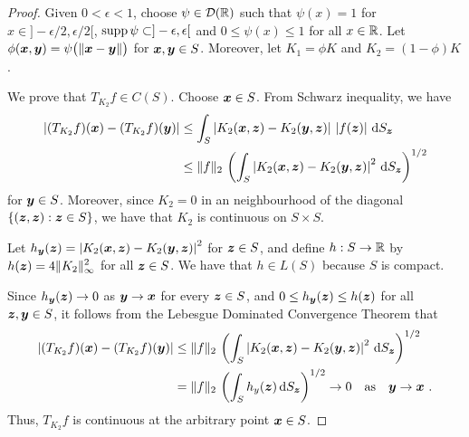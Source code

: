 \begin{proof}
Given $0 < \epsilon < 1$, choose $\psi \in \mathcal{D}(\mathbb{R})$ such that
$\psi(x)=1$ for $x \in ]-\epsilon/2, \epsilon/2[$,
$\operatorname{supp} \psi \subset ]-\epsilon, \epsilon[$ and $0\leq \psi(x)\leq 1$
for all $x\in \mathbb{R}$.  Let
$\phi({\bm{x}},{\bm{y}}) = \psi\big(\|{\bm{x}}-{\bm{y}}\|\big)$ for
${\bm{x}}, {\bm{y}} \in S$.  Moreover, let $K_1 = \phi K$ and
$K_2 = (1-\phi)K$.

 We prove that $T_{K_2} f \in C(S)$.  Choose ${\bm{x}}\in S$.
From Schwarz inequality, we have
\begin{align*}
\left| (T_{K_2} f)({\bm{x}}) - (T_{K_2} f)({\bm{y}})\right|
&\leq \int_S \left| K_2({\bm{x}},{\bm{z}}) - K_2({\bm{y}},{\bm{z}}) \right|\,
\left| f({\bm{z}}) \right| \,\mathrm{d}{S}_{{\bm{z}}} \\
&\leq \|f\|_2 \, \left( \int_S \left|K_2({\bm{x}},{\bm{z}}) -
K_2({\bm{y}},{\bm{z}}) \right|^2 \,\mathrm{d}{S}_{{\bm{z}}} \right)^{1/2}
\end{align*}
for ${\bm{y}} \in S$.  Moreover, since $K_2 =0$ in an neighbourhood of
the diagonal $\{({\bm{z}},{\bm{z}}) : {\bm{z}} \in S\}$, we have that
$K_2$ is continuous on $S\times S$.

Let
$\displaystyle h_{{\bm{y}}}({\bm{z}}) = \left|K_2({\bm{x}},{\bm{z}}) -
K_2({\bm{y}},{\bm{z}})\right|^2$ for ${\bm{z}} \in S$, and define
$h:S \to \mathbb{R}$ by $\displaystyle h({\bm{z}}) = 4\|K_2\|_\infty^2$
 for all ${\bm{z}} \in S$.
We have that $h \in L(S)$ because $S$ is compact.

Since $h_{{\bm{y}}}({\bm{z}}) \rightarrow 0$ as
${\bm{y}} \rightarrow {\bm{x}}$ for every ${\bm{z}} \in S$,
and $0\leq h_{{\bm{y}}}({\bm{z}}) \leq h({\bm{z}})$ for all
${\bm{z}}, {\bm{y}}\in S$, it follows from the Lebesgue Dominated
Convergence Theorem that
\begin{align*}
\left| (T_{K_2} f)({\bm{x}}) - (T_{K_2} f)({\bm{y}})\right|
&\leq \|f\|_2 \, \left( \int_S \left|K_2({\bm{x}},{\bm{z}}) -
K_2({\bm{y}},{\bm{z}}) \right|^2 \,\mathrm{d}{S}_{{\bm{z}}} \right)^{1/2} \\
&= \|f\|_2 \, \left( \int_S h_y({\bm{z}}) \,\mathrm{d}{S}_{{\bm{z}}} \right)^{1/2}
\rightarrow 0 \quad \text{as} \quad {\bm{y}} \rightarrow {\bm{x}} \ .
\end{align*}
Thus, $T_{K_2}f$ is continuous at the arbitrary point ${\bm{x}} \in S$.


\end{proof}
